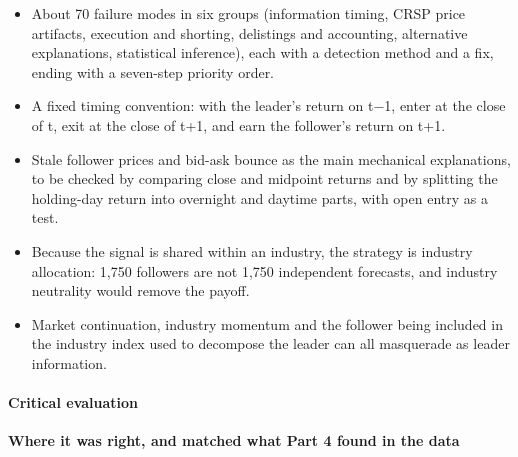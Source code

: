 \begin{itemize}
\tightlist
\item
  About 70 failure modes in six groups (information timing, CRSP price artifacts,
  execution and shorting, delistings and accounting, alternative explanations,
  statistical inference), each with a detection method and a fix, ending with a
  seven-step priority order.
\item
  A fixed timing convention: with the leader's return on t−1, enter at the close of t,
  exit at the close of t+1, and earn the follower's return on t+1.
\item
  Stale follower prices and bid-ask bounce as the main mechanical explanations, to be
  checked by comparing close and midpoint returns and by splitting the holding-day
  return into overnight and daytime parts, with open entry as a test.
\item
  Because the signal is shared within an industry, the strategy is industry allocation:
  1,750 followers are not 1,750 independent forecasts, and industry neutrality would
  remove the payoff.
\item
  Market continuation, industry momentum and the follower being included in the
  industry index used to decompose the leader can all masquerade as leader information.
\end{itemize}

\hypertarget{critical-evaluation}{%
\paragraph{Critical evaluation}\label{critical-evaluation}}

\textbf{Where it was right, and matched what Part 4 found in the data}

